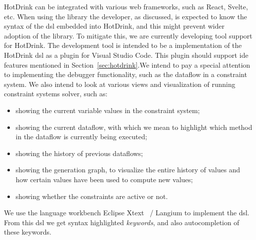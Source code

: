 HotDrink can be integrated with various web frameworks, such as React, Svelte, etc. When using the library the developer, as discussed, is expected to know the syntax of the \gls{dsl} embedded into HotDrink, and this might prevent wider adoption of the library. To mitigate this, we are currently developing tool support for HotDrink. The development tool is intended to be a implementation of the HotDrink \gls{dsl} as a plugin for Visual Studio Code. This plugin should support \gls{ide} features mentioned in Section~\ref{sec:hotdrink}.We intend to pay a special attention to implementing the debugger functionality, such as 
the dataflow in a constraint system. We also intend to look at various views and 
visualization of running constraint systems solver, such as: 
\begin{itemize}
    \item showing the current variable values in the constraint system;
    \item showing the current dataflow, with which we mean to highlight which method in the dataflow is currently being executed;
    \item showing the history of previous dataflows;
    \item showing the generation graph, to visualize the entire history of values and how certain values have been used to compute new values;
    \item showing whether the constraints are active or not.
\end{itemize}

We use the language workbench Eclipse Xtext~\cite{eysholdt_xtext:_2010} / 
Langium to implement the \gls{dsl}. From this \gls{dsl} we get syntax 
highlighted \textit{keywords}, and also autocompletion of these keywords. 
